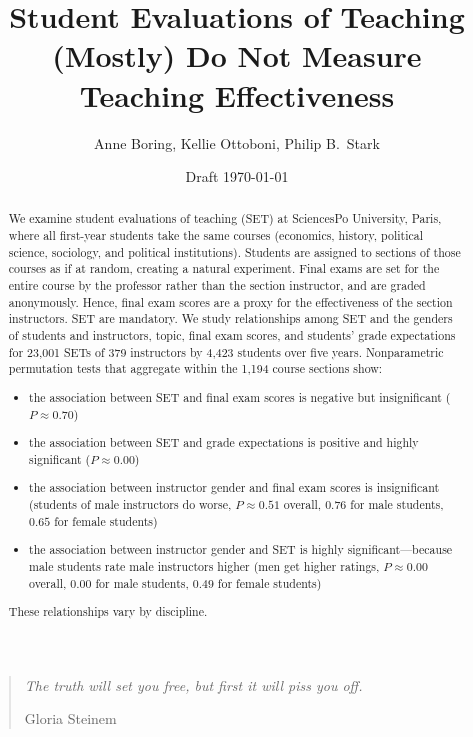 \documentclass[12pt]{article}
\title{Student Evaluations of Teaching (Mostly) Do Not Measure Teaching Effectiveness}
\author{Anne Boring, Kellie Ottoboni, Philip B.~Stark}
\date{Draft \today}
\begin{document}
\maketitle

\newpage
\begin{quotation}
    \emph{The truth will set you free, but first it will piss you off.}
    
     \hfill Gloria Steinem

\begin{abstract}
We examine student evaluations of teaching (SET) at SciencesPo
University, Paris, where all
first-year students take the same courses 
(economics, history, political science, sociology, and political institutions). 
Students are assigned to sections of those courses as if at random, creating a natural experiment.
Final exams are set for the entire course
by the professor rather than the section instructor, and are graded anonymously.
Hence, final exam scores are a proxy for the effectiveness of the section instructors.
SET are mandatory.
We study relationships among SET and the genders of students and
instructors, topic, final exam scores, and students' grade expectations
for 23,001 SETs of 379 instructors by 4,423 students over five years.
Nonparametric permutation tests that aggregate within the 1,194 course sections show: 
\begin{itemize}
   \item the association between SET and final 
            exam scores is negative but insignificant
            ($P \approx 0.70$)
   \item the association between SET and grade 
            expectations is positive and highly significant
            ($P \approx 0.00$)
   \item the association between instructor gender 
            and final exam scores is insignificant
            (students of male instructors do worse, $P \approx 0.51$ overall, $0.76$ 
            for male students, $0.65$ for female students)
   \item the association between instructor gender and SET is highly significant---because male
             students rate male instructors higher 
            (men get higher ratings, $P \approx 0.00$ overall, $0.00$ for male students,
            $0.49$ for female students)
\end{itemize}
These relationships vary by discipline.

\end{abstract}

\newpage

\end{quotation}
\end{document}
